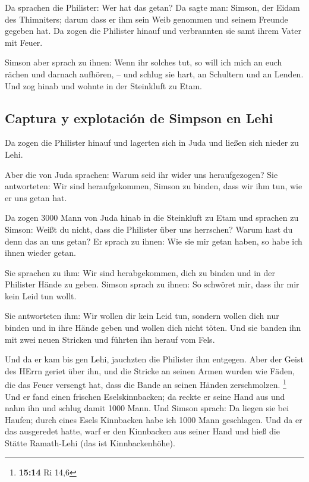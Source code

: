  Da sprachen die Philister: Wer hat das getan? Da sagte
man: Simson, der Eidam des Thimniters; darum dass er ihm sein Weib
genommen und seinem Freunde gegeben hat. Da zogen die Philister hinauf
und verbrannten sie samt ihrem Vater mit Feuer.

 Simson aber sprach zu ihnen: Wenn ihr solches tut, so
will ich mich an euch rächen und darnach aufhören, --  und
schlug sie hart, an Schultern und an Lenden. Und zog hinab und wohnte in
der Steinkluft zu Etam.

\hypertarget{captura-y-explotaciuxf3n-de-simpson-en-lehi}{%
\subsection{Captura y explotación de Simpson en
Lehi}\label{captura-y-explotaciuxf3n-de-simpson-en-lehi}}

 Da zogen die Philister hinauf und lagerten sich in Juda
und ließen sich nieder zu Lehi.

 Aber die von Juda sprachen: Warum seid ihr wider uns
heraufgezogen? Sie antworteten: Wir sind heraufgekommen, Simson zu
binden, dass wir ihm tun, wie er uns getan hat.

 Da zogen 3000 Mann von Juda hinab in die Steinkluft zu
Etam und sprachen zu Simson: Weißt du nicht, dass die Philister über uns
herrschen? Warum hast du denn das an uns getan? Er sprach zu ihnen: Wie
sie mir getan haben, so habe ich ihnen wieder getan.

 Sie sprachen zu ihm: Wir sind herabgekommen, dich zu
binden und in der Philister Hände zu geben. Simson sprach zu ihnen: So
schwöret mir, dass ihr mir kein Leid tun wollt.

 Sie antworteten ihm: Wir wollen dir kein Leid tun,
sondern wollen dich nur binden und in ihre Hände geben und wollen dich
nicht töten. Und sie banden ihn mit zwei neuen Stricken und führten ihn
herauf vom Fels.

 Und da er kam bis gen Lehi, jauchzten die Philister ihm
entgegen. Aber der Geist des HErrn geriet über ihn, und die Stricke an
seinen Armen wurden wie Fäden, die das Feuer versengt hat, dass die
Bande an seinen Händen zerschmolzen. \footnote{\textbf{15:14} Ri 14,6}
 Und er fand einen frischen Eselskinnbacken; da reckte er
seine Hand aus und nahm ihn und schlug damit 1000 Mann. 
Und Simson sprach: Da liegen sie bei Haufen; durch eines Esels
Kinnbacken habe ich 1000 Mann geschlagen.  Und da er das
ausgeredet hatte, warf er den Kinnbacken aus seiner Hand und hieß die
Stätte Ramath-Lehi (das ist Kinnbackenhöhe).

